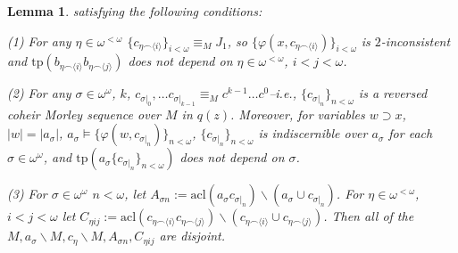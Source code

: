 \documentclass{amsart}
\newtheorem{lemma}[theorem]{Lemma}
\theoremstyle{definition}
\theoremstyle{remark}
\numberwithin{equation}{section}
\begin{document}
\begin{lemma}
satisfying the following conditions:




(1) For any $\eta \in \omega^{< \omega}$ $\{c_{\eta \smallfrown \langle i \rangle}\}_{i < \omega} \equiv_{M} J_{1}$, so $\{\varphi(x, c_{\eta \smallfrown \langle i \rangle})\}_{i < \omega}$ is $2$-inconsistent and $\mathrm{tp}(b_{\eta \smallfrown \langle i \rangle}b_{\eta \smallfrown \langle j \rangle})$ does not depend on $\eta \in \omega^{< \omega} $,  $i < j < \omega$.


(2) For any $\sigma \in \omega^{\omega}$, $k$, $c_{\sigma|_{0}}, \ldots  c_{\sigma|_{k-1}}\equiv_{M} c^{k-1}\ldots c^{0}$--i.e., $\{c_{\sigma|_{n}}\}_{n < \omega}$ is a reversed coheir Morley sequence over $M$ in $q(z)$. Moreover, for variables $w \supset x$, $|w| = |a_{\sigma}|$,  $a_{\sigma} \models  \{\varphi(w, c_{\sigma|_{n}})\}_{n < \omega}$, $\{c_{\sigma|_{n}}\}_{n < \omega}$ is indiscernible over $a_{\sigma}$ for each $\sigma \in \omega^{\omega}$, and $\mathrm{tp}(a_{\sigma}\{c_{\sigma|_{n}}\}_{n < \omega})$ does not depend on $\sigma$.

(3) For $\sigma \in \omega^{\omega}$ $n < \omega$, let $A_{\sigma n}:=\mathrm{acl}(a_{\sigma}c_{\sigma|_{n}})\backslash(a_{\sigma} \cup c_{\sigma|_{n}})$. For $\eta \in \omega^{< \omega}$, $i < j < \omega$ let $C_{\eta ij}:= \mathrm{acl}(c_{\eta \smallfrown \langle i \rangle } c_{\eta \smallfrown \langle j \rangle }) \backslash (c_{\eta \smallfrown \langle i \rangle } \cup c_{\eta \smallfrown \langle j \rangle }) $. Then all of the $M, a_{\sigma} \backslash M,c_{\eta} \backslash M, A_{\sigma n}, C_{\eta ij}$ are disjoint.


\end{lemma}
\end{document}
